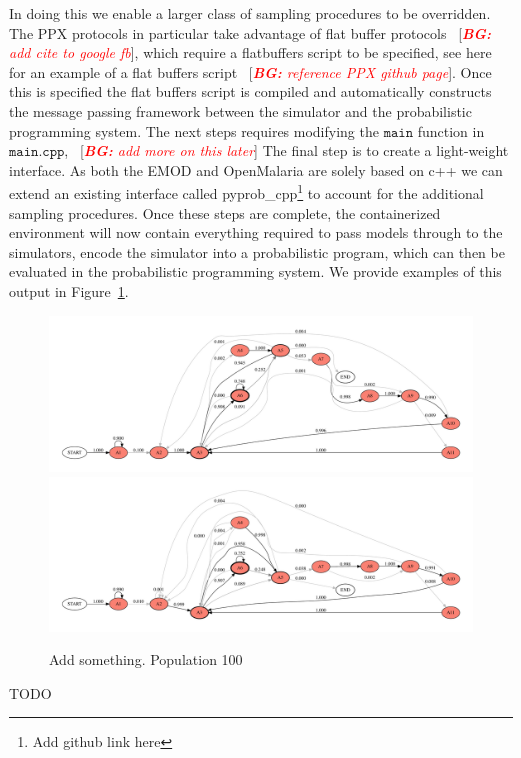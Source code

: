 \documentclass{article}
\newcommand{\bg}[1]{~{{[{\it \textcolor{red}{{\bf BG:} #1}}]}}}
\begin{document}
In doing this we enable a larger class of sampling procedures to be overridden. The PPX protocols in particular take advantage of flat buffer protocols \bg{add cite to google fb}, which require a flatbuffers script to be specified, see here for an example of a flat buffers script \bg{reference PPX github page}. Once this is specified the flat buffers script is compiled and automatically constructs the message passing framework between the simulator and the probabilistic programming system. 
The next steps requires modifying the $\texttt{main}$ function in $\texttt{main.cpp}$, \bg{add more on this later}
The final step is to create a light-weight interface. As both the EMOD and OpenMalaria are solely based on c++ we can extend an existing interface called pyprob\_cpp\footnote{Add github link here} to account for the additional sampling procedures.
Once these steps are complete, the containerized environment will now contain everything required to pass models through to the simulators, encode the simulator into a probabilistic program, which can then be evaluated in the probabilistic programming system. We provide examples of this output in Figure~\ref{fig:plotewan}. 


\begin{figure}[h!]
	\centering
	\includegraphics[width=\textwidth]{../plots/ewan_25_pop_10.pdf}
	\centering
	\includegraphics[width=\textwidth]{../plots/ewan_25_pop_100.pdf}
	\caption{Add something. Population 100}
	\label{fig:plotewan}
\end{figure}
TODO
\end{document}
